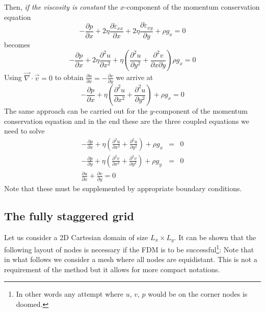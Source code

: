 Then, {\sl if the viscosity is constant} the $x$-component of 
the momentum conservation equation
\[
-\frac{\partial p}{\partial x}  + 2\eta \frac{\partial \dot{\varepsilon}_{xx}}{\partial x} +  2\eta \frac{\partial \dot{\varepsilon}_{xy}}{\partial y}  + \rho g_x =0
\]
becomes
\[
-\frac{\partial p}{\partial x}  + 2\eta \frac{\partial^2 u}{\partial x^2} +  \eta 
\left( \frac{\partial^2 u}{\partial y^2 } + \frac{\partial^2 v}{\partial x \partial y} \right)  \rho g_x =0
\]
Using ${\vec \nabla} \cdot {\vec v} = 0$ to obtain $\frac{\partial u}{\partial x} =  - \frac{\partial v}{\partial y}  $ we arrive at 
\[
-\frac{\partial p}{\partial x}  + \eta \left( \frac{\partial^2 u}{\partial x^2} +  \frac{\partial^2 u}{\partial y^2 }  \right)
+ \rho g_x =0
\]
The same approach can be carried out for the $y$-component of the momentum conservation
equation and in the end
these are the three coupled equations we need to solve
\begin{eqnarray}
-\frac{\partial p}{\partial x}  
+ \eta \left( \frac{\partial^2 u}{\partial x^2} 
+ \frac{\partial^2 u}{\partial y^2 }  \right) + \rho g_x &=&0 \\
-\frac{\partial p}{\partial y}  
+ \eta \left( \frac{\partial^2 v}{\partial x^2} 
+ \frac{\partial^2 v}{\partial y^2 }  \right) + \rho g_y  &=& 0 \\
\frac{\partial u}{\partial x} + \frac{\partial v}{\partial y}  = 0 
\end{eqnarray}
Note that these must be supplemented by appropriate boundary conditions.

\subsection{The fully staggered grid}

Let us consider a 2D Cartesian domain of size $L_x \times L_y$.
It can be shown that the following layout of nodes is necessary 
if the FDM is to be successful\footnote{In other words
any attempt where $u$, $v$, $p$ would be on the corner nodes is doomed.}:
Note that in what follows we consider a mesh where all nodes are equidistant.
This is not a requirement of the method but it allows for more compact notations. 



